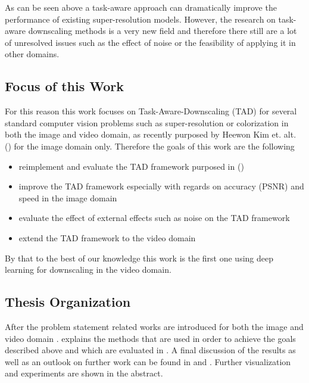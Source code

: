 As can be seen above a task-aware approach can dramatically improve the
performance of existing super-resolution models. However, the research on task-
aware downscaling methods is a very new field and therefore there still are
a lot of unresolved issues such as the effect of noise or the feasibility of
applying it in other domains.

\newpage
\subsection{Focus of this Work}
For this reason this work focuses on Task-Aware-Downscaling (TAD) for several standard
computer vision problems such as super-resolution or colorization in both the
image and video domain, as recently purposed by Heewon Kim et. alt. (\cite{TAID})
for the image domain only. Therefore the goals of this work are the following

\begin{itemize}
  \item reimplement and evaluate the TAD framework purposed in (\cite{TAID})
  \item improve the TAD framework especially with regards on accuracy
  (PSNR) and speed in the image domain
  \item evaluate the effect of external effects such as noise on the TAD
  framework
  \item extend the TAD framework to the video domain
\end{itemize}

By that to the best of our knowledge this work is the first one using deep
learning for downscaling in the video domain.

\subsection{Thesis Organization}
After the problem statement  related works are
introduced for both the image and video domain .
 explains the methods that are used in order to
achieve the goals described above and which are evaluated in
. A final discussion of the results
as well as an outlook on further work can be found in
 and .
Further visualization and experiments are shown in the abstract.

